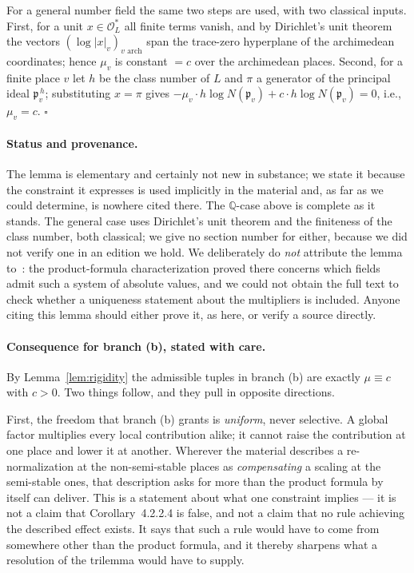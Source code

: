 \documentclass[11pt,a4paper]{article}
\theoremstyle{definition}
\theoremstyle{plain}
\theoremstyle{definition}
\begin{document}
For a general number field the same two steps are used, with two classical inputs.
First, for a unit $x \in \mathcal{O}_L^*$ all finite terms vanish, and by
Dirichlet's unit theorem the vectors $(\log|x|_v)_{v \text{ arch}}$ span the
trace-zero hyperplane of the archimedean coordinates; hence $\mu_v$ is constant
$= c$ over the archimedean places. Second, for a finite place $v$ let $h$ be the
class number of $L$ and $\pi$ a generator of the principal ideal
$\mathfrak{p}_v^{\,h}$; substituting $x = \pi$ gives
$-\mu_v \cdot h\log N(\mathfrak{p}_v) + c \cdot h\log N(\mathfrak{p}_v) = 0$, i.e.,\
$\mu_v = c$. \hfill$\square$

\paragraph{Status and provenance.}
The lemma is elementary and certainly not new in substance; we state it because
the constraint it expresses is used implicitly in the material and, as far as we
could determine, is nowhere cited there. The $\mathbb{Q}$-case above is complete
as it stands. The general case uses Dirichlet's unit theorem and the finiteness of
the class number, both classical; we give no section number for either, because we
did not verify one in an edition we hold. We deliberately do \emph{not} attribute
the lemma to~\cite{ArtinWhaples1945}: the product-formula characterization proved
there concerns which fields admit such a system of absolute values, and we could
not obtain the full text to check whether a uniqueness statement about the
multipliers is included. Anyone citing this lemma should either prove it, as here,
or verify a source directly.

\paragraph{Consequence for branch (b), stated with care.}
By Lemma~\ref{lem:rigidity} the admissible tuples in branch (b) are exactly
$\mu \equiv c$ with $c > 0$. Two things follow, and they pull in opposite
directions.

First, the freedom that branch (b) grants is \emph{uniform}, never selective. A
global factor multiplies every local contribution alike; it cannot raise the
contribution at one place and lower it at another. Wherever the material describes
a re-normalization at the non-semi-stable places as \emph{compensating} a scaling
at the semi-stable ones, that description asks for more than the product formula
by itself can deliver. This is a statement about what one constraint implies --- it
is not a claim that Corollary~4.2.2.4 is false, and not a claim that no rule
achieving the described effect exists. It says that such a rule would have to come
from somewhere other than the product formula, and it thereby sharpens what a
resolution of the trilemma would have to supply.
\end{document}

